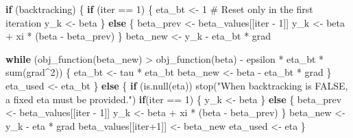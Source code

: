 \documentclass[
  letterpaper,
  DIV=11,
  numbers=noendperiod]{scrartcl}
\newenvironment{Shaded}{\begin{snugshade}}{\end{snugshade}}
\newcommand{\CommentTok}[1]{\textcolor[rgb]{0.37,0.37,0.37}{#1}}
\newcommand{\ControlFlowTok}[1]{\textcolor[rgb]{0.00,0.23,0.31}{\textbf{#1}}}
\newcommand{\DecValTok}[1]{\textcolor[rgb]{0.68,0.00,0.00}{#1}}
\newcommand{\FunctionTok}[1]{\textcolor[rgb]{0.28,0.35,0.67}{#1}}
\newcommand{\NormalTok}[1]{\textcolor[rgb]{0.00,0.23,0.31}{#1}}
\newcommand{\OtherTok}[1]{\textcolor[rgb]{0.00,0.23,0.31}{#1}}
\newcommand{\SpecialCharTok}[1]{\textcolor[rgb]{0.37,0.37,0.37}{#1}}
\newcommand{\StringTok}[1]{\textcolor[rgb]{0.13,0.47,0.30}{#1}}
\begin{document}
\begin{Shaded}
\begin{Highlighting}[]
    \ControlFlowTok{if}\NormalTok{ (backtracking) \{}
      \ControlFlowTok{if}\NormalTok{ (iter }\SpecialCharTok{==} \DecValTok{1}\NormalTok{) \{}
\NormalTok{        eta\_bt }\OtherTok{\textless{}{-}} \DecValTok{1} \CommentTok{\# Reset only in the first iteration}
\NormalTok{        y\_k }\OtherTok{\textless{}{-}}\NormalTok{ beta}
\NormalTok{      \}}
      \ControlFlowTok{else}\NormalTok{ \{}
\NormalTok{        beta\_prev }\OtherTok{\textless{}{-}}\NormalTok{ beta\_values[[iter }\SpecialCharTok{{-}} \DecValTok{1}\NormalTok{]]}
\NormalTok{        y\_k }\OtherTok{\textless{}{-}}\NormalTok{ beta }\SpecialCharTok{+}\NormalTok{ xi }\SpecialCharTok{*}\NormalTok{ (beta }\SpecialCharTok{{-}}\NormalTok{ beta\_prev)}
\NormalTok{      \}}
\NormalTok{      beta\_new }\OtherTok{\textless{}{-}}\NormalTok{ y\_k }\SpecialCharTok{{-}}\NormalTok{ eta\_bt }\SpecialCharTok{*}\NormalTok{ grad}
      
      \ControlFlowTok{while}\NormalTok{ (}\FunctionTok{obj\_function}\NormalTok{(beta\_new) }\SpecialCharTok{\textgreater{}} \FunctionTok{obj\_function}\NormalTok{(beta) }\SpecialCharTok{{-}}\NormalTok{ epsilon }\SpecialCharTok{*}\NormalTok{ eta\_bt }\SpecialCharTok{*} \FunctionTok{sum}\NormalTok{(grad}\SpecialCharTok{\^{}}\DecValTok{2}\NormalTok{)) \{}
\NormalTok{        eta\_bt }\OtherTok{\textless{}{-}}\NormalTok{ tau }\SpecialCharTok{*}\NormalTok{ eta\_bt}
\NormalTok{        beta\_new }\OtherTok{\textless{}{-}}\NormalTok{ beta }\SpecialCharTok{{-}}\NormalTok{ eta\_bt }\SpecialCharTok{*}\NormalTok{ grad}
\NormalTok{      \}}
\NormalTok{      eta\_used }\OtherTok{\textless{}{-}}\NormalTok{ eta\_bt}
\NormalTok{    \} }\ControlFlowTok{else}\NormalTok{ \{}
      \ControlFlowTok{if}\NormalTok{ (}\FunctionTok{is.null}\NormalTok{(eta)) }\FunctionTok{stop}\NormalTok{(}\StringTok{"When backtracking is FALSE, a fixed eta must be provided."}\NormalTok{)}
      \ControlFlowTok{if}\NormalTok{(iter }\SpecialCharTok{==} \DecValTok{1}\NormalTok{) \{}
\NormalTok{        y\_k }\OtherTok{\textless{}{-}}\NormalTok{ beta}
\NormalTok{      \} }\ControlFlowTok{else}\NormalTok{ \{}
\NormalTok{        beta\_prev }\OtherTok{\textless{}{-}}\NormalTok{ beta\_values[[iter }\SpecialCharTok{{-}} \DecValTok{1}\NormalTok{]]}
\NormalTok{        y\_k }\OtherTok{\textless{}{-}}\NormalTok{ beta }\SpecialCharTok{+}\NormalTok{ xi }\SpecialCharTok{*}\NormalTok{ (beta }\SpecialCharTok{{-}}\NormalTok{ beta\_prev)}
\NormalTok{      \}}
\NormalTok{      beta\_new }\OtherTok{\textless{}{-}}\NormalTok{ y\_k }\SpecialCharTok{{-}}\NormalTok{ eta }\SpecialCharTok{*}\NormalTok{ grad}
\NormalTok{      beta\_values[[iter}\SpecialCharTok{+}\DecValTok{1}\NormalTok{]] }\OtherTok{\textless{}{-}}\NormalTok{ beta\_new}
\NormalTok{      eta\_used }\OtherTok{\textless{}{-}}\NormalTok{ eta}
\NormalTok{    \}}
    

\end{Highlighting}
\end{Shaded}
\end{document}
